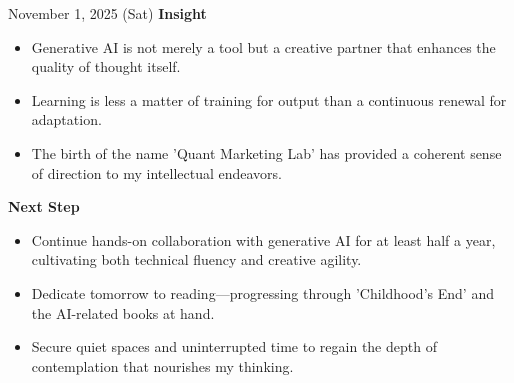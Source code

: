 \documentclass[dvipdfmx, autodetect-engine, aspectratio=169, 10.5pt]{beamer}
\begin{document}
\begin{frame}{November 1, 2025 (Sat)}
	\textbf{Insight}  
	\begin{itemize}
		\item Generative AI is not merely a tool but a creative partner that enhances the quality of thought itself.  
		\item Learning is less a matter of training for output than a continuous renewal for adaptation.  
		\item The birth of the name 'Quant Marketing Lab' has provided a coherent sense of direction to my intellectual endeavors.  
	\end{itemize}

	\textbf{Next Step}  
	\begin{itemize}
		\item Continue hands-on collaboration with generative AI for at least half a year, cultivating both technical fluency and creative agility.  
		\item Dedicate tomorrow to reading—progressing through 'Childhood's End' and the AI-related books at hand.  
		\item Secure quiet spaces and uninterrupted time to regain the depth of contemplation that nourishes my thinking.  
	\end{itemize}
\end{frame}
\end{document}
